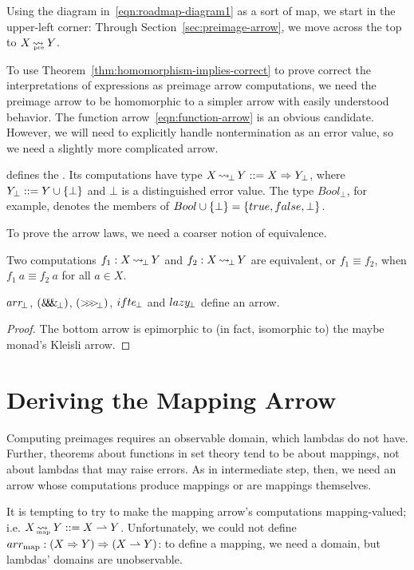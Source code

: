 Using the diagram in~\eqref{eqn:roadmap-diagram1} as a sort of map, we start in the upper-left corner:
Through Section~\ref{sec:preimage-arrow}, we move across the top to $X \operatorname{\rightsquigarrow_{\mspace{-20mu}_\mathrm{pre}}} Y$.

To use Theorem~\ref{thm:homomorphism-implies-correct} to prove correct the interpretations of expressions as preimage arrow computations, we need the preimage arrow to be homomorphic to a simpler arrow with easily understood behavior.
The function arrow~\eqref{eqn:function-arrow} is an obvious candidate.
However, we will need to explicitly handle nontermination as an error value, so we need a slightly more complicated arrow.

 defines the .
Its computations have type $X \operatorname{\rightsquigarrow_{\mspace{-3mu}\bot}} Y ::= X \Rightarrow Y_\bot$, where $Y_\bot ::= Y \cup \{{\bot}\}$ and $\bot$ is a distinguished error value.
The type $Bool_\bot$, for example, denotes the members of $Bool \cup \{{\bot}\} = \{{true,false,\bot}\}$.

To prove the arrow laws, we need a coarser notion of equivalence.

\begin{definition}
Two computations $f_1 : X \operatorname{\rightsquigarrow_{\mspace{-3mu}\bot}} Y$ and $f_2 : X \operatorname{\rightsquigarrow_{\mspace{-3mu}\bot}} Y$ are equivalent, or $f_1 \equiv f_2$, when $f_1~a \equiv f_2~a$ for all $a \in X$.
\end{definition}

\begin{theorem}
$arr_{\mspace{-3mu}\bot}$, $(\mathit{\&\mspace{-7.5mu}\&\mspace{-7.5mu}\&}_{\mspace{-3mu}\bot})$, $({>}\mspace{-6mu}{>}\mspace{-6mu}{>}_{\mspace{-5mu}\bot})$, $ifte_{\mspace{-2mu}\bot}$ and $lazy_{\mspace{-2mu}\bot}$ define an arrow.
\end{theorem}
\begin{proof}
The bottom arrow is epimorphic to (in fact, isomorphic to) the maybe monad's Kleisli arrow.
\end{proof}

\section{Deriving the Mapping Arrow}

Computing preimages requires an observable domain, which lambdas do not have.
Further, theorems about functions in set theory tend to be about mappings, not about lambdas that may raise errors.
As in intermediate step, then, we need an arrow whose computations produce mappings or are mappings themselves.

It is tempting to try to make the mapping arrow's computations mapping-valued; i.e. $X \operatorname{\rightsquigarrow_{\mspace{-23mu}_\mathrm{map}}} Y ::= X \rightharpoonup Y$.
Unfortunately, we could not define $arr_\mathrm{map} : (X \Rightarrow Y) \Rightarrow (X \rightharpoonup Y)$: to define a mapping, we need a domain, but lambdas' domains are unobservable.

